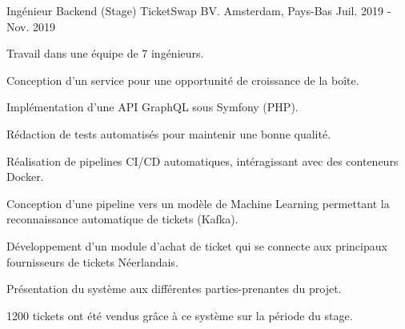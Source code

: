 

\begin{cventries}

  \cventry
    {Ingénieur Backend (Stage)} %
    {TicketSwap BV.} %
    {Amsterdam, Pays-Bas} %
    {Juil. 2019 - Nov. 2019} %
    {
      \begin{cvitems} %
        \item {Travail dans une équipe de 7 ingénieurs.}
        \item {Conception d'un service pour une opportunité de croissance de la boîte.}
        \item {Implémentation d'une API GraphQL sous Symfony (PHP).}
        \item {Rédaction de tests automatisés pour maintenir une bonne qualité.}
        \item {Réalisation de pipelines CI/CD automatiques, intéragissant avec des conteneurs Docker.}
        \item {Conception d'une pipeline vers un modèle de Machine Learning permettant la reconnaissance automatique de tickets (Kafka).}
        \item {Développement d'un module d'achat de ticket qui se connecte aux principaux fournisseurs de tickets Néerlandais.}
        \item {Présentation du système aux différentes parties-prenantes du projet.}
        \item {1200 tickets ont été vendus grâce à ce système sur la période du stage.}
      \end{cvitems}
    }

\end{cventries}
